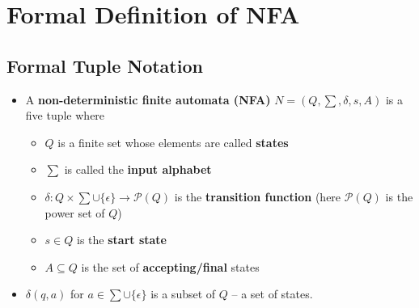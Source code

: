 \documentclass[12pt]{article}
\begin{document}
\section{Formal Definition of NFA}

\subsection{Formal Tuple Notation}
\begin{itemize}
    \item A \textbf{non-deterministic finite automata (NFA)} $N = (Q, \sum, \delta, s, A)$ is a five tuple where
    \begin{itemize}
        \item $Q$ is a finite set whose elements are called \textbf{states}
        \item $\sum$ is called the \textbf{input alphabet}
        \item $\delta: Q \times \sum \cup \{ \epsilon \} \rightarrow \mathcal{P}(Q)$ is the \textbf{transition function} (here $\mathcal{P}(Q)$ is the power set of $Q$)
        \item $s \in Q$ is the \textbf{start state}
        \item $A \subseteq Q$ is the set of \textbf{accepting/final} states
    \end{itemize}
    \item $\delta(q, a)$ for $a \in \sum \cup \{ \epsilon \}$ is a subset of $Q$ -- a set of states.
\end{itemize}
\end{document}
